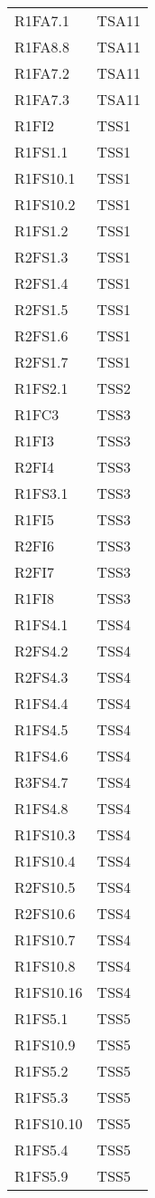 {\begin{longtable}{C{4cm} C{4cm}}
R1FA7.1 & TSA11  \\
R1FA8.8 & TSA11  \\
R1FA7.2 & TSA11  \\
R1FA7.3 & TSA11  \\

R1FI2 & TSS1 \\
R1FS1.1 & TSS1 \\
R1FS10.1 & TSS1 \\
R1FS10.2 & TSS1 \\
R1FS1.2 & TSS1 \\
R2FS1.3 & TSS1 \\
R2FS1.4 & TSS1 \\
R2FS1.5 & TSS1 \\
R2FS1.6 & TSS1 \\
R2FS1.7 & TSS1 \\
R1FS2.1 & TSS2 \\
R1FC3 & TSS3 \\
R1FI3 & TSS3 \\
R2FI4 & TSS3 \\
R1FS3.1 & TSS3 \\
R1FI5 & TSS3 \\
R2FI6 & TSS3 \\
R2FI7 & TSS3 \\
R1FI8 & TSS3 \\
R1FS4.1 & TSS4 \\
R2FS4.2 & TSS4 \\
R2FS4.3 & TSS4 \\
R1FS4.4 & TSS4 \\
R1FS4.5 & TSS4 \\
R1FS4.6 & TSS4 \\
R3FS4.7 & TSS4 \\
R1FS4.8 & TSS4 \\
R1FS10.3 & TSS4 \\
R1FS10.4 & TSS4 \\
R2FS10.5 & TSS4 \\
R2FS10.6 & TSS4 \\
R1FS10.7 & TSS4 \\
R1FS10.8 & TSS4 \\
R1FS10.16 & TSS4 \\
R1FS5.1 & TSS5 \\
R1FS10.9 & TSS5 \\
R1FS5.2 & TSS5 \\
R1FS5.3 & TSS5 \\
R1FS10.10 & TSS5 \\
R1FS5.4 & TSS5 \\
R1FS5.9 & TSS5 \\

\end{longtable}}
